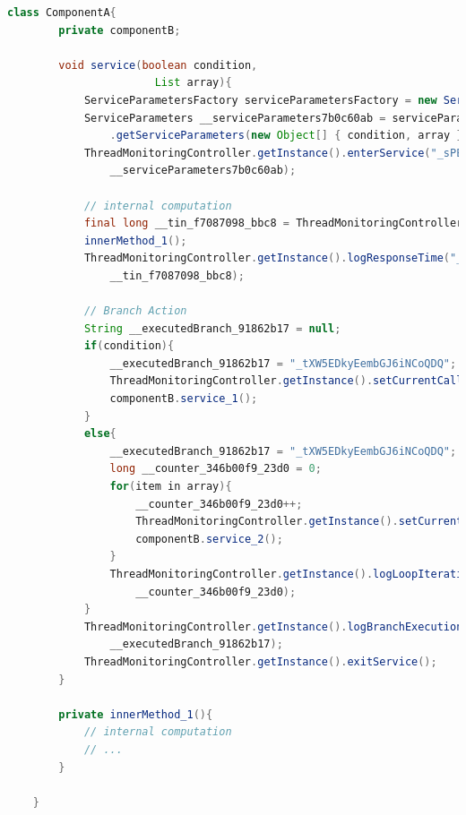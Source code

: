 \begin{lstlisting}[caption={Instrumented version of the source code in Figure \ref{fig:Example of source code and SEFF}, the instrumentation is the result of the execution of our approach},label={lst:instrumented_code}, captionpos=b, language=java] 
  class ComponentA{
        private componentB; 
        
        void service(boolean condition,
                       List array){        
            ServiceParametersFactory serviceParametersFactory = new ServiceParametersFactoryImp();
		    ServiceParameters __serviceParameters7b0c60ab = serviceParametersFactory
				.getServiceParameters(new Object[] { condition, array }, new String[] { "condition", "array" });
		    ThreadMonitoringController.getInstance().enterService("_sPEbUDkyEembGJ6iNCoQDQ",
				__serviceParameters7b0c60ab);
                
            // internal computation
            final long __tin_f7087098_bbc8 = ThreadMonitoringController.getInstance().getTime();
            innerMethod_1();
            ThreadMonitoringController.getInstance().logResponseTime("_tWldADkyEembGJ6iNCoQDQ", "_oro4gG3fEdy4YaaT-RYrLQ",
				__tin_f7087098_bbc8);
            
            // Branch Action
            String __executedBranch_91862b17 = null;            
            if(condition){
                __executedBranch_91862b17 = "_tXW5EDkyEembGJ6iNCoQDQ";
                ThreadMonitoringController.getInstance().setCurrentCallerId("_tXeN0DkyEembGJ6iNCoQDQ");
                componentB.service_1();
            }
            else{
                __executedBranch_91862b17 = "_tXW5EDkyEembGJ6iNCoQDQ";
                long __counter_346b00f9_23d0 = 0;
                for(item in array){
                    __counter_346b00f9_23d0++;
                    ThreadMonitoringController.getInstance().setCurrentCallerId("_nXeN0DkyHdnbGJ6iNCoQDW");
                    componentB.service_2();
                }
                ThreadMonitoringController.getInstance().logLoopIterationCount("_tXbKgDkyEembGJ6iNCoQDQ",
					__counter_346b00f9_23d0);
            }
            ThreadMonitoringController.getInstance().logBranchExecution("_tXVD4DkyEembGJ6iNCoQDQ",
				__executedBranch_91862b17);
            ThreadMonitoringController.getInstance().exitService();   
        }
        
        private innerMethod_1(){
            // internal computation
            // ...
        }
        
    } 
\end{lstlisting}


